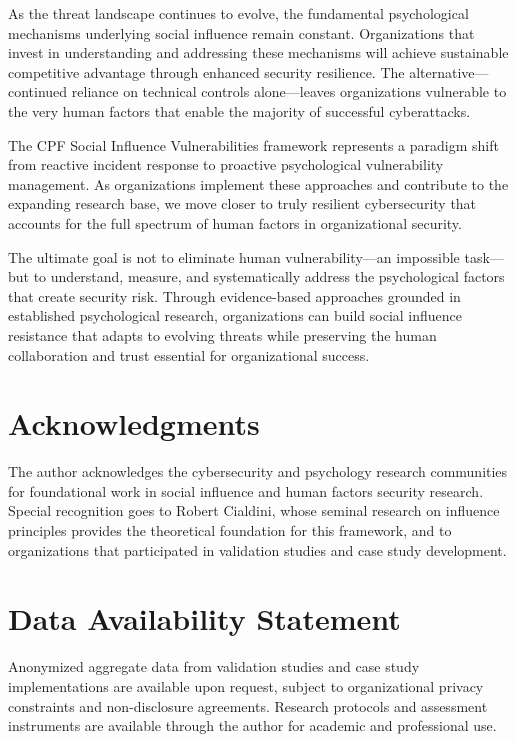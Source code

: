 \documentclass[11pt,a4paper]{article}
\begin{document}
As the threat landscape continues to evolve, the fundamental psychological mechanisms underlying social influence remain constant. Organizations that invest in understanding and addressing these mechanisms will achieve sustainable competitive advantage through enhanced security resilience. The alternative—continued reliance on technical controls alone—leaves organizations vulnerable to the very human factors that enable the majority of successful cyberattacks.

The CPF Social Influence Vulnerabilities framework represents a paradigm shift from reactive incident response to proactive psychological vulnerability management. As organizations implement these approaches and contribute to the expanding research base, we move closer to truly resilient cybersecurity that accounts for the full spectrum of human factors in organizational security.

The ultimate goal is not to eliminate human vulnerability—an impossible task—but to understand, measure, and systematically address the psychological factors that create security risk. Through evidence-based approaches grounded in established psychological research, organizations can build social influence resistance that adapts to evolving threats while preserving the human collaboration and trust essential for organizational success.

\section*{Acknowledgments}

The author acknowledges the cybersecurity and psychology research communities for foundational work in social influence and human factors security research. Special recognition goes to Robert Cialdini, whose seminal research on influence principles provides the theoretical foundation for this framework, and to organizations that participated in validation studies and case study development.

\section*{Data Availability Statement}

Anonymized aggregate data from validation studies and case study implementations are available upon request, subject to organizational privacy constraints and non-disclosure agreements. Research protocols and assessment instruments are available through the author for academic and professional use.
\end{document}
